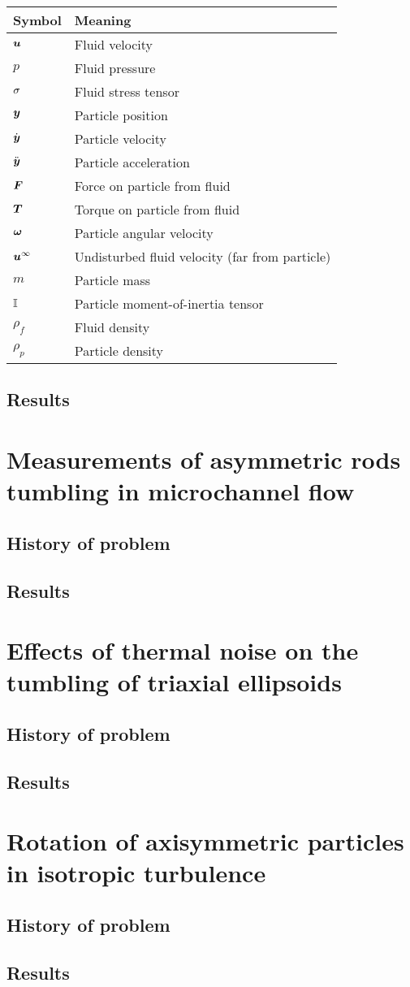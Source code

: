 \documentclass[thesis.tex]{subfiles}
\begin{document}
\begin{table}
    \begin{tabular}{ll}
    \toprule
    Symbol & Meaning \\
    \midrule
    $\mbox{\boldmath$u$}$      & Fluid velocity       \\
    $p$      & Fluid pressure       \\
    $\mathbb{\sigma}$      & Fluid stress tensor       \\
    $\mbox{\boldmath$y$}$      & Particle position       \\
    $\dot{\mbox{\boldmath$y$}}$      & Particle velocity       \\
    $\ddot{\mbox{\boldmath$y$}}$      & Particle acceleration       \\
    $\mbox{\boldmath$F$}$      & Force on particle from fluid       \\
    $\mbox{\boldmath$T$}$      & Torque on particle from fluid       \\
    $\mbox{\boldmath$\omega$}$      & Particle angular velocity       \\
    $\mbox{\boldmath$u$}^\infty$      & Undisturbed fluid velocity (far from particle)       \\
    $m$      & Particle mass       \\
    $\mathbb{I}$ & Particle moment-of-inertia tensor \\
    $\rho_f$      & Fluid density       \\
    $\rho_p$      & Particle density       \\
    \bottomrule
    \end{tabular}
\end{table}

\section{Results}

\chapter{Measurements of asymmetric rods tumbling in microchannel flow}
\section{History of problem}
\section{Results}
\chapter{Effects of thermal noise on the tumbling of triaxial ellipsoids}
\section{History of problem}
\section{Results}
\chapter{Rotation of axisymmetric particles in isotropic turbulence}
\section{History of problem}
\section{Results}
\end{document}
